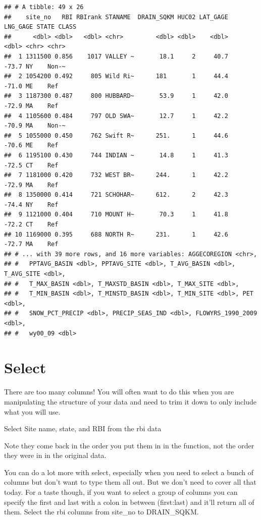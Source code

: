 \documentclass[
]{book}
\begin{document}
\begin{verbatim}
## # A tibble: 49 x 26
##    site_no   RBI RBIrank STANAME  DRAIN_SQKM HUC02 LAT_GAGE LNG_GAGE STATE CLASS
##      <dbl> <dbl>   <dbl> <chr>         <dbl> <dbl>    <dbl>    <dbl> <chr> <chr>
##  1 1311500 0.856    1017 VALLEY ~       18.1     2     40.7    -73.7 NY    Non-~
##  2 1054200 0.492     805 Wild Ri~      181       1     44.4    -71.0 ME    Ref  
##  3 1187300 0.487     800 HUBBARD~       53.9     1     42.0    -72.9 MA    Ref  
##  4 1105600 0.484     797 OLD SWA~       12.7     1     42.2    -70.9 MA    Non-~
##  5 1055000 0.450     762 Swift R~      251.      1     44.6    -70.6 ME    Ref  
##  6 1195100 0.430     744 INDIAN ~       14.8     1     41.3    -72.5 CT    Ref  
##  7 1181000 0.420     732 WEST BR~      244.      1     42.2    -72.9 MA    Ref  
##  8 1350000 0.414     721 SCHOHAR~      612.      2     42.3    -74.4 NY    Ref  
##  9 1121000 0.404     710 MOUNT H~       70.3     1     41.8    -72.2 CT    Ref  
## 10 1169000 0.395     688 NORTH R~      231.      1     42.6    -72.7 MA    Ref  
## # ... with 39 more rows, and 16 more variables: AGGECOREGION <chr>,
## #   PPTAVG_BASIN <dbl>, PPTAVG_SITE <dbl>, T_AVG_BASIN <dbl>, T_AVG_SITE <dbl>,
## #   T_MAX_BASIN <dbl>, T_MAXSTD_BASIN <dbl>, T_MAX_SITE <dbl>,
## #   T_MIN_BASIN <dbl>, T_MINSTD_BASIN <dbl>, T_MIN_SITE <dbl>, PET <dbl>,
## #   SNOW_PCT_PRECIP <dbl>, PRECIP_SEAS_IND <dbl>, FLOWYRS_1990_2009 <dbl>,
## #   wy00_09 <dbl>
\end{verbatim}

\hypertarget{select}{%
\section{Select}\label{select}}

There are too many columns! You will often want to do this when you are manipulating the structure of your data and need to trim it down to only include what you will use.

Select Site name, state, and RBI from the rbi data

Note they come back in the order you put them in in the function, not the order they were in in the original data.

You can do a lot more with select, especially when you need to select a bunch of columns but don't want to type them all out. But we don't need to cover all that today. For a taste though, if you want to select a group of columns you can specify the first and last with a colon in between (first:last) and it'll return all of them. Select the rbi columns from site\_no to DRAIN\_SQKM.
\end{document}
